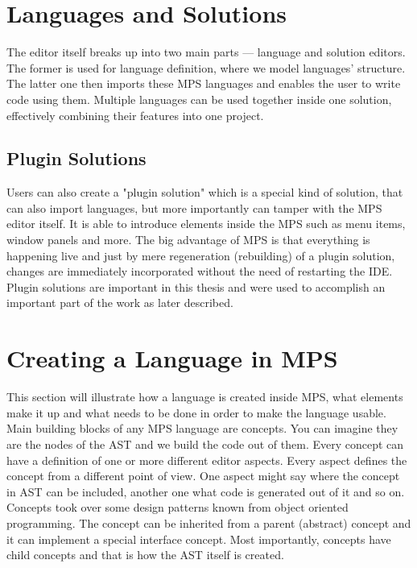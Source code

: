 \section{Languages and Solutions}

The editor itself breaks up into two main parts --- language and solution editors.
The former is used for language definition, where we model languages' structure.
The latter one then imports these MPS languages and enables the user to write code using them.
Multiple languages can be used together inside one solution, effectively combining their features into one project.

\subsection{Plugin Solutions}

Users can also create a "plugin solution" which is a special kind of solution, that can also import languages, but more importantly can tamper with the MPS editor itself.
It is able to introduce elements inside the MPS such as menu items, window panels and more.
The big advantage of MPS is that everything is happening live and just by mere regeneration (rebuilding) of a plugin solution, changes are immediately incorporated without the need of restarting the IDE.
Plugin solutions are important in this thesis and were used to accomplish an important part of the work as later described.

\section{Creating a Language in MPS}

This section will illustrate how a language is created inside MPS, what elements make it up and what needs to be done in order to make the language usable.
\\

Main building blocks of any MPS language are concepts.
You can imagine they are the nodes of the AST and we build the code out of them.
Every concept can have a definition of one or more different editor aspects.
Every aspect defines the concept from a different point of view.
One aspect might say where the concept in AST can be included, another one what code is generated out of it and so on.
Concepts took over some design patterns known from object oriented programming.
The concept can be inherited from a parent (abstract) concept and it can implement a special interface concept.
Most importantly, concepts have child concepts and that is how the AST itself is created.
\\

